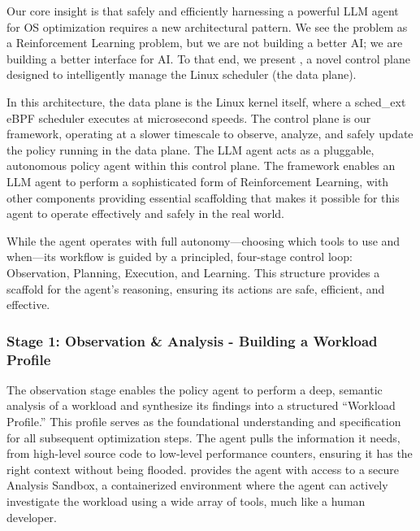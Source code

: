 Our core insight is that safely and efficiently harnessing a powerful LLM agent for OS optimization requires a new architectural pattern. We see the problem as a Reinforcement Learning problem, but we are not building a better AI; we are building a better interface for AI. To that end, we present \sys, a novel control plane designed to intelligently manage the Linux scheduler (the data plane).

In this architecture, the data plane is the Linux kernel itself, where a sched\_ext eBPF scheduler executes at microsecond speeds. The control plane is our framework, operating at a slower timescale to observe, analyze, and safely update the policy running in the data plane. The LLM agent acts as a pluggable, autonomous policy agent within this control plane. The framework enables an LLM agent to perform a sophisticated form of Reinforcement Learning, with other components providing essential scaffolding that makes it possible for this agent to operate effectively and safely in the real world.

While the agent operates with full autonomy—choosing which tools to use and when—its workflow is guided by a principled, four-stage control loop: Observation, Planning, Execution, and Learning. This structure provides a scaffold for the agent's reasoning, ensuring its actions are safe, efficient, and effective.

\subsubsection{Stage 1: Observation \& Analysis - Building a Workload Profile}

The observation stage enables the policy agent to perform a deep, semantic analysis of a workload and synthesize its findings into a structured ``Workload Profile.'' This profile serves as the foundational understanding and specification for all subsequent optimization steps. The agent pulls the information it needs, from high-level source code to low-level performance counters, ensuring it has the right context without being flooded. \sys provides the agent with access to a secure Analysis Sandbox, a containerized environment where the agent can actively investigate the workload using a wide array of tools, much like a human developer.

